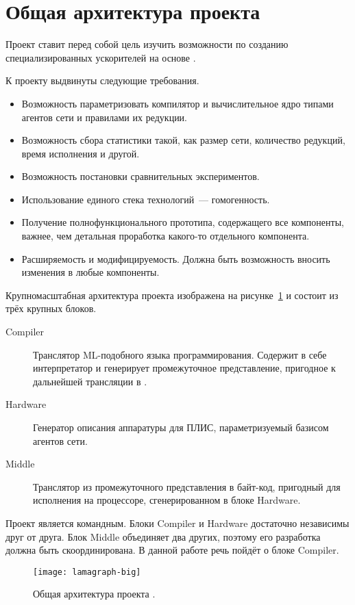 
\section{Общая архитектура проекта}
\label{sec:big-arch}

Проект \Lamagraph{} ставит перед собой цель изучить возможности по созданию специализированных ускорителей на основе \INs{}.

К проекту выдвинуты следующие требования.
\begin{itemize}
    \item Возможность параметризовать компилятор и вычислительное ядро типами агентов сети и правилами их редукции.
    \item Возможность сбора статистики такой, как размер сети, количество редукций, время исполнения и другой.
    \item Возможность постановки сравнительных экспериментов.
    \item Использование единого стека технологий~--- гомогенность.
    \item Получение полнофункционального прототипа, содержащего все компоненты, важнее, чем детальная проработка какого-то отдельного компонента.
    \item Расширяемость и модифицируемость.
          Должна быть возможность вносить изменения в любые компоненты.
\end{itemize}


Крупномасштабная архитектура проекта изображена на рисунке~\ref{fig:lamagraph-big} и состоит из трёх крупных блоков.
\begin{description}
    \item[Compiler] Транслятор ML-подобного языка программирования.
          Содержит в себе интерпретатор и генерирует промежуточное представление, пригодное к дальнейшей трансляции в \INs{}.
    \item[Hardware] Генератор описания аппаратуры для ПЛИС, параметризуемый базисом агентов сети.
    \item[Middle] Транслятор из промежуточного представления в байт-код, пригодный для исполнения на процессоре, сгенерированном в блоке Hardware.
\end{description}


Проект является командным.
Блоки Compiler и Hardware достаточно независимы друг от друга.
Блок Middle объединяет два других, поэтому его разработка должна быть скоординирована.
В данной работе речь пойдёт о блоке Compiler.

\begin{figure}
    \begin{center}
        \texttt{[image: lamagraph-big]}
    \end{center}
    \caption{Общая архитектура проекта \Lamagraph{}.}
    \label{fig:lamagraph-big}
\end{figure}
